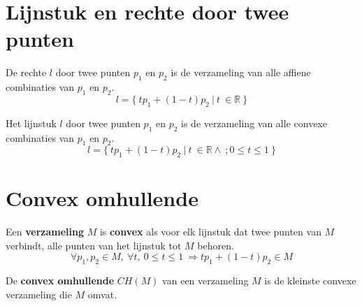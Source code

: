 \documentclass[computergesteund_ontwerp_van_curven_en_oppervlakken.tex]{subfiles}
\begin{document}
\section{Lijnstuk en rechte door twee punten}
\begin{de}
\label{rechte}
De rechte $l$ door twee punten $p_1$ en $p_2$ is de verzameling van alle affiene combinaties van $p_1$ en $p_2$.
\[
l = \{\ tp_1 + (1-t)p_2\ |\ t\ \in \mathbb{R}\ \}
\]
\end{de}
\begin{de}
\label{lijnstuk}
Het lijnstuk $l$ door twee punten $p_1$ en $p_2$ is de verzameling van alle convexe combinaties van $p_1$ en $p_2$.
\[
l = \{\ tp_1 + (1-t)p_2\ |\ t\ \in \mathbb{R}\wedge\ ;0\le t\le 1\ \}
\]
\end{de}

\section{Convex omhullende}
\label{convex_omhullende}
\begin{de}
Een \textbf{verzameling} $M$ is \textbf{convex} als voor elk lijnstuk dat twee punten van $M$ verbindt, alle punten van het lijnstuk tot $M$ behoren.
\[
\forall p_1,p_2 \in M,\ \forall t,\ 0\le t\le 1\ \Rightarrow tp_1+(1-t)p_2 \in M
\]
\end{de}
\begin{de}
De \textbf{convex omhullende} $CH(M)$ van een verzameling $M$ is de kleinste convexe verzameling die $M$ omvat.
\end{de}
\end{document}
